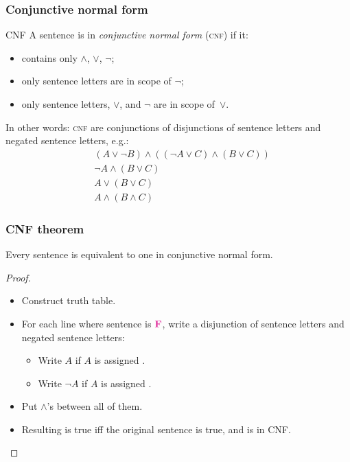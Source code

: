 \begin{frame}
  \frametitle{Conjunctive normal form}

  \begin{block}{CNF}
    A sentence is in \emph{conjunctive normal form} (\textsc{cnf}) if it:
    \begin{itemize}
      \item contains only $\land$, $\lor$, $\lnot$;
      \item only sentence letters are in scope of $\lnot$;
      \item only sentence letters, $\lor$, and $\lnot$ are in scope of~$\lor$.
    \end{itemize}
  \end{block}

  In other words: \textsc{cnf} are conjunctions of disjunctions of
  sentence letters and negated sentence letters, e.g.:
  \begin{align*}
  & (A \lor \lnot B) \land ((\lnot A \lor C) \land (B \lor C))\\
  & \lnot A \land (B \lor C)\\
  & A \lor (B \lor C) \\
  & A \land (B \land C)
  \end{align*}

\end{frame}

\begin{frame}
\frametitle{CNF theorem}

\begin{theorem}
Every sentence is equivalent to one in conjunctive normal form.
\end{theorem}

\begin{proof}
\begin{itemize}[<+->]
  \item Construct truth table.
  \item For each line where sentence is $\False$, write a disjunction
  of sentence letters and negated sentence letters:
  \begin{itemize}[<+->]
    \item Write $A$ if $A$ is assigned \False.
    \item Write $\lnot A$ if $A$ is assigned \True.
  \end{itemize}
  \item Put $\land$'s between all of them.
  \item Resulting is true iff the original sentence is true, and is in CNF.
\end{itemize}
\end{proof}
\end{frame}

